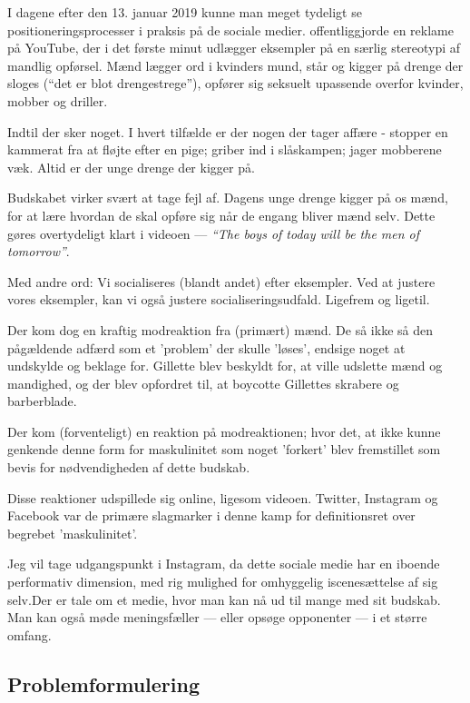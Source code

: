 I dagene efter den 13. januar 2019 kunne man meget tydeligt se
positioneringsprocesser i praksis på de sociale medier.
\citeauthor{gilletteWeBelieveBest2019}  offentliggjorde en reklame
på YouTube, der i det første minut udlægger eksempler på en særlig
stereotypi af mandlig opførsel. Mænd lægger ord i kvinders mund,
står og kigger på drenge der sloges (“det er blot drengestrege”),
opfører sig seksuelt upassende overfor kvinder, mobber og driller.

Indtil der sker noget. I hvert tilfælde er der nogen der tager
affære - stopper en kammerat fra at fløjte efter en pige; griber
ind i slåskampen; jager mobberene væk. Altid er der unge drenge
der kigger på.

Budskabet virker svært at tage fejl af. Dagens unge drenge kigger
på os mænd, for at lære hvordan de skal opføre sig når de engang
bliver mænd selv. Dette gøres overtydeligt klart i videoen --- 
\textit{“The boys of today will be the men of tomorrow”}.

Med andre ord: Vi socialiseres (blandt andet) efter eksempler. Ved
at justere vores eksempler, kan vi også justere
socialiseringsudfald. Ligefrem og ligetil.

Der kom dog en kraftig modreaktion fra (primært) mænd.
De så ikke så den pågældende adfærd som et 'problem' der skulle
'løses', endsige noget at undskylde og beklage for. Gillette blev
beskyldt for, at ville udslette mænd og mandighed, og der blev
opfordret til, at boycotte Gillettes skrabere og barberblade. 

Der kom (forventeligt) en reaktion på modreaktionen; hvor det, at
ikke kunne genkende denne form for maskulinitet som noget
'forkert' blev fremstillet som bevis for nødvendigheden af dette
budskab. 

Disse reaktioner udspillede sig online, ligesom videoen. Twitter,
Instagram og Facebook var de primære slagmarker i denne kamp for
definitionsret over begrebet 'maskulinitet'.

Jeg vil tage udgangspunkt i Instagram, da dette sociale medie har
en iboende performativ dimension, med rig mulighed for omhyggelig
iscenesættelse af sig selv.Der er tale om et medie, hvor man kan
nå ud til mange med sit budskab. Man kan også møde meningsfæller —
eller opsøge opponenter — i et større omfang.

\subsection{Problemformulering}

